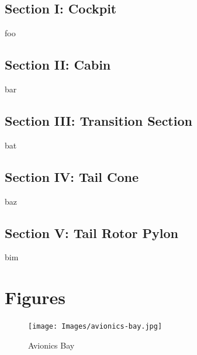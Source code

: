 \documentclass[letterpaper,11pt,openany,oneside]{book}
\begin{document}
\section*{Section I: Cockpit}
foo
\section*{Section II: Cabin}
bar
\section*{Section III: Transition Section}
bat
\section*{Section IV: Tail Cone}
baz
\section*{Section V: Tail Rotor Pylon}
bim
\chapter*{Figures}
\begin{figure}[htp]
	\texttt{[image: Images/avionics-bay.jpg]}
	\caption{Avionics Bay} \label{avionics}
\end{figure}
\end{document}
